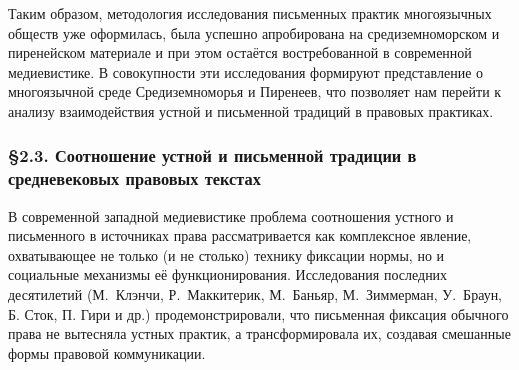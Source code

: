Таким образом, методология исследования письменных практик многоязычных обществ уже оформилась, была успешно апробирована на средиземноморском и пиренейском материале и при этом остаётся востребованной в современной медиевистике. В совокупности эти исследования формируют представление о многоязычной среде Средиземноморья и Пиренеев, что позволяет нам перейти к анализу взаимодействия устной и письменной традиций в правовых практиках.

\subsubsection*{§2.3. Соотношение устной и письменной традиции в средневековых правовых текстах}

В современной западной медиевистике проблема соотношения устного и письменного в источниках права рассматривается как комплексное явление, охватывающее не только (и не столько) технику фиксации нормы, но и социальные механизмы её функционирования. Исследования последних десятилетий (М.~Клэнчи, Р.~Маккитерик, М.~Баньяр, М.~Зиммерман, У.~Браун, Б. Сток, П. Гири и др.) продемонстрировали, что письменная фиксация обычного права не вытесняла устных практик, а трансформировала их, создавая смешанные формы правовой коммуникации.

